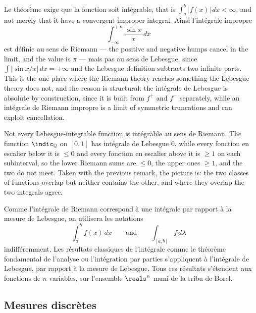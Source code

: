 \begin{remark}
  Le théorème exige que la fonction soit intégrable, that is $\int_{a}^{b} |f(x)| \,
  dx < \infty$, and not merely that it have a convergent improper integral. Ainsi
  l'intégrale impropre
  \[
    \int_{-\infty}^{+\infty} \frac{\sin x}{x} \, dx
  \]
  est définie au sens de Riemann --- the positive and negative humps cancel in the
  limit, and the value is $\pi$ --- mais pas au sens de Lebesgue, since $\int |\sin
  x / x| \, dx = +\infty$ and the Lebesgue definition subtracts two infinite parts.
  This is the one place where the Riemann theory reaches something the Lebesgue
  theory does not, and the reason is structural: the intégrale de Lebesgue is
  absolute by construction, since it is built from $f^{+}$ and $f^{-}$ separately,
  while an intégrale de Riemann impropre is a limit of symmetric truncations and can
  exploit cancellation.
\end{remark}

\begin{remark}
  Not every Lebesgue-integrable function is intégrable au sens de Riemann. The
  function $\indic_{\mathbb{Q}}$ on $[0,1]$ has intégrale de Lebesgue $0$, while
  every fonction en escalier below it is $\leq 0$ and every fonction en escalier
  above it is $\geq 1$ on each subinterval, so the lower Riemann sums are $\leq 0$,
  the upper ones $\geq 1$, and the two do not meet. Taken with the previous remark,
  the picture is: the two classes of functions overlap but neither contains the
  other, and where they overlap the two integrals agree.
\end{remark}

Comme l'intégrale de Riemann correspond à une intégrale par rapport à la mesure de
Lebesgue, on utilisera les notations
\[
  \int_{a}^{b} f(x) \, dx
  \qquad \text{and} \qquad
  \int_{[a,b]} f \, d\lambda
\]
indifféremment. Les résultats classiques de l'intégrale comme le théorème fondamental de l'analyse
ou l'intégration par parties s'appliquent à l'intégrale de Lebesgue, par rapport à
la mesure de Lebesgue. Tous ces résultats s'étendent aux fonctions de $n$ variables,
sur l'ensemble $\reals^{n}$ muni de la tribu de Borel.

\subsection{Mesures discrètes}

